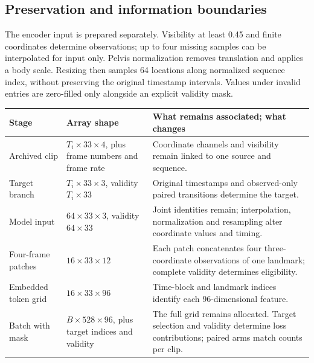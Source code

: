 \documentclass{article}
\begin{document}
\subsection{Preservation and information boundaries}\label{preservation-and-information-boundaries}

The encoder input is prepared separately. Visibility at least 0.45 and finite coordinates determine observations; up to four missing samples can be interpolated for input only. Pelvis normalization removes translation and applies a body scale. Resizing then samples 64 locations along normalized sequence index, without preserving the original timestamp intervals. Values under invalid entries are zero-filled only alongside an explicit validity mask.

\begin{table}[htbp]
\centering
\small
\begin{tabular}{@{}
  >{\raggedright\arraybackslash}p{}
  >{\raggedright\arraybackslash}p{}
  >{\raggedright\arraybackslash}p{}@{}}
\toprule\noalign{}
\begin{minipage}[b]{\linewidth}\raggedright
Stage
\end{minipage} & \begin{minipage}[b]{\linewidth}\raggedright
Array shape
\end{minipage} & \begin{minipage}[b]{\linewidth}\raggedright
What remains associated; what changes
\end{minipage} \\
\midrule\noalign{}

Archived clip & \(T_i\times33\times4\), plus frame numbers and frame rate & Coordinate channels and visibility remain linked to one source and sequence. \\
Target branch & \(T_i\times33\times3\), validity \(T_i\times33\) & Original timestamps and observed-only paired transitions determine the target. \\
Model input & \(64\times33\times3\), validity \(64\times33\) & Joint identities remain; interpolation, normalization and resampling alter coordinate values and timing. \\
Four-frame patches & \(16\times33\times12\) & Each patch concatenates four three-coordinate observations of one landmark; complete validity determines eligibility. \\
Embedded token grid & \(16\times33\times96\) & Time-block and landmark indices identify each 96-dimensional feature. \\
Batch with mask & \(B\times528\times96\), plus target indices and validity & The full grid remains allocated. Target selection and validity determine loss contributions; paired arms match counts per clip. \\
\bottomrule
\end{tabular}
\end{table}
\end{document}
